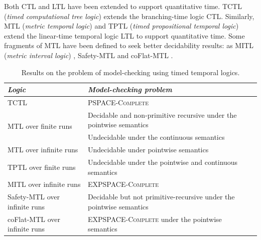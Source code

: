Both CTL and LTL have been extended to support quantitative time. TCTL (\emph{timed computational tree logic}) \cite{HNSY94} extends the branching-time logic CTL. Similarly, MTL (\emph{metric temporal logic}) \cite{Koymans90} and TPTL (\emph{timed propositional temporal logic}) \cite{AlurH89,AlurH94} extend the linear-time temporal logic LTL to support quantitative time. Some fragments of MTL have been defined to seek better decidability results: as MITL (\emph{metric interval logic}) \cite{AlurFH96}, Safety-MTL \cite{OuaknineW05} and coFlat-MTL \cite{BouyerMOW07}. 

\begin{table}[htbp]
\centering
\footnotesize
\begin{tabular}{|p{3.5cm}|p{9cm}|}

    \hline

    \textit{Logic} &
    \textit{Model-checking problem} \\
    
    \hline
    
    TCTL &
    \textsc{PSPACE-Complete} \cite{AlurCD90,AlurCD93} \\
    
    \hline
    
    \multirow{2}{5cm}{MTL over finite runs} &
    Decidable and non-primitive recursive under the pointwise semantics \cite{OW07} \\
    
    \cline{2--2} &
    Undecidable under the continuous semantics \cite{AlurFH96} \\
    
    \hline
    
    MTL over infinite runs &
    Undecidable under pointwise semantics \cite{OuaknineW06} \\
    
    \hline
    
    TPTL over finite runs &
    Undecidable under the pointwise and continuous semantics \cite{AlurH94} \\
    
    \hline
    
    MITL over infinite runs &
    \textsc{EXPSPACE-Complete} \cite{AlurFH96} \\
    
    \hline
    
    Safety-MTL over infinite runs &
    Decidable but not primitive-recursive under the pointwise semantics \cite{OuaknineW05} \\
    
    \hline
    
    coFlat-MTL over infinite runs &
    \textsc{EXPSPACE-Complete} under the pointwise semantics \cite{BouyerMOW07} \\
    
    \hline
    

\end{tabular}
\caption{Results on the problem of model-checking using timed temporal logics.}
\label{tab:temporal-logics-checking}
\end{table}

